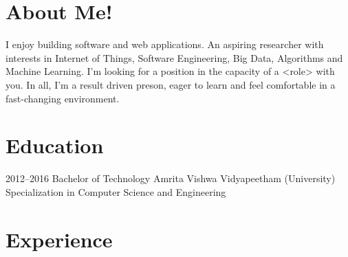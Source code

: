 \documentclass[]{friggeri-cv} %
\begin{document}
\section{About Me!}
I enjoy building software and web applications. An aspiring researcher with interests in Internet of Things, Software Engineering, Big Data, Algorithms and Machine Learning. I'm looking for a position in the capacity of a <role> with you. In all, I'm a result driven preson, eager to learn and feel comfortable in a fast-changing environment.


\section{Education}

\begin{entrylist}




\entry
{2012--2016}
{Bachelor {\normalfont of Technology}}
{Amrita Vishwa Vidyapeetham (University)}
{Specialization in Computer Science and Engineering}


\end{entrylist}


\section{Experience}
\end{document}
